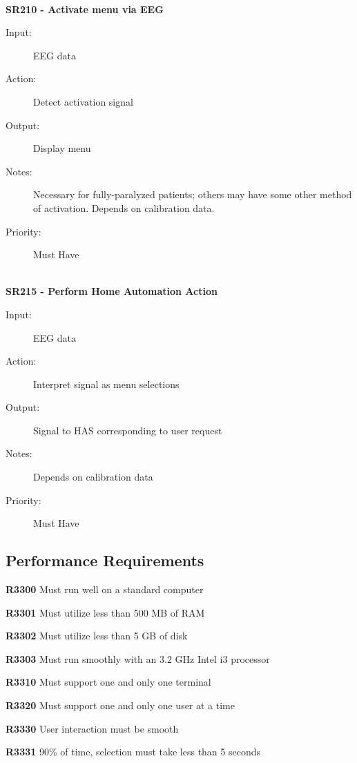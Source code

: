 \documentclass{article}
\begin{document}
\hfill \\

\textbf{SR210 - Activate menu via EEG}
\begin{description}
    \item[Input:] EEG data
    \item[Action:] Detect activation signal
    \item[Output:] Display menu
    \item[Notes:] Necessary for fully-paralyzed patients; others may have some
        other method of activation. Depends on calibration data.
    \item[Priority:] Must Have
\end{description}

\hfill \\

\textbf{SR215 - Perform Home Automation Action}
\begin{description}
    \item[Input:] EEG data
    \item[Action:] Interpret signal as menu selections
    \item[Output:] Signal to HAS corresponding to user request
    \item[Notes:] Depends on calibration data
    \item[Priority:] Must Have
\end{description}
\subsection{Performance Requirements}
\textbf{R3300} Must run well on a standard computer

\setlength\parindent{24pt}
\textbf{R3301} Must utilize less than 500 MB of RAM

\textbf{R3302} Must utilize less than 5 GB of disk

\textbf{R3303} Must run smoothly with an 3.2 GHz Intel i3 processor

\setlength\parindent{0pt}

\textbf{R3310} Must support one and only one terminal

\textbf{R3320} Must support one and only one user at a time

\textbf{R3330} User interaction must be smooth
\setlength\parindent{24pt} 

\textbf{R3331} 90\% of time, selection must take less than 5 seconds
\end{document}
